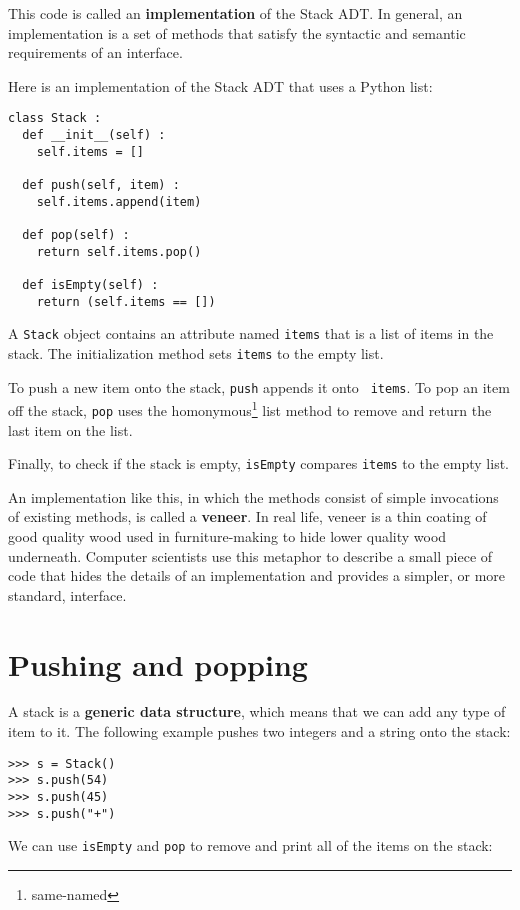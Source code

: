 This code is called an {\bf implementation} of the Stack ADT.
In general, an implementation is a set of methods that satisfy
the syntactic and semantic requirements of an interface.

Here is an implementation of the Stack ADT that uses a Python list:

\beforeverb
\begin{verbatim}
class Stack :
  def __init__(self) :
    self.items = []

  def push(self, item) :
    self.items.append(item)

  def pop(self) :
    return self.items.pop()

  def isEmpty(self) :
    return (self.items == [])
\end{verbatim}
\afterverb
%
A {\tt Stack} object contains an attribute named {\tt items}
that is a list of items in the stack.  The initialization method
sets {\tt items} to the empty list.

To push a new item onto the stack, {\tt push} appends it onto {\tt
items}.  To pop an item off the stack, {\tt pop} uses the
homonymous\footnote{same-named} list method to remove and return the
last item on the list.

Finally, to check if the stack is empty, {\tt isEmpty} compares
{\tt items} to the empty list.


An implementation like this, in which the methods consist of simple
invocations of existing methods, is called a {\bf veneer}.  In real
life, veneer is a thin coating of good quality wood used in
furniture-making to hide lower quality wood underneath.  Computer
scientists use this metaphor to describe a small piece of code that
hides the details of an implementation and provides a simpler, or more
standard, interface.


\section{Pushing and popping}

A stack is a {\bf generic data structure}, which means that we can
add any type of item to it.  The following example pushes
two integers and a string onto the stack:

\beforeverb
\begin{verbatim}
>>> s = Stack()
>>> s.push(54)
>>> s.push(45)
>>> s.push("+")
\end{verbatim}
\afterverb
%
We can use {\tt isEmpty} and {\tt pop} to remove and print
all of the items on the stack:

